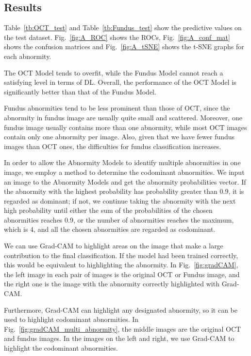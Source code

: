 \documentclass{article}
\begin{document}
	\begin{multicols}{2}
		
		\subsection{Results}
		
		Table~\ref{tb:OCT_test} and Table~\ref{tb:Fundus_test} show the predictive values on the test dataset. Fig.~\ref{fig:A_ROC} shows the ROCs, Fig.~\ref{fig:A_conf_mat} shows the confusion matrices and Fig.~\ref{fig:A_tSNE} shows the t-SNE graphs for each abnormity.
		
		The OCT Model tends to overfit, while the Fundus Model cannot reach a satisfying level in terms of DL. Overall, the performance of the OCT Model is significantly better than that of the Fundus Model.
		
		Fundus abnormities tend to be less prominent than those of OCT, since the abnormity in fundus image are usually quite small and scattered. Moreover, one fundus image usually contains more than one abnormity, while most OCT images contain only one abnormity per image. Also, given that we have fewer fundus images than OCT ones, the difficulties for fundus classification increases.
		
		In order to allow the Abnormity Models to identify multiple abnormities in one image, we employ a method to determine the codominant abnormities. We input an image to the Abnormity Models and get the abnormity probabilities vector. If the abnormity with the highest probability has probability greater than 0.9, it is regarded as dominant; if not, we continue taking the abnormity with the next high probability until either the sum of the probabilities of the chosen abnormities reaches 0.9, or the number of abnormities reaches the maximum, which is 4, and all the chosen abnormities are regarded as codominant. 
		
		\vspace{0.3cm}
		
		We can use Grad-CAM \autocite{Selvaraju_Cogswell_Das_Vedantam_Parikh_Batra} to highlight areas on the image that make a large contribution to the final classification. If the model had been trained correctly, this would be equivalent to highlighting the abnormity. In Fig.~\ref{fig:gradCAM}, the left image in each pair of images is the original OCT or Fundus image, and the right one is the image with the abnormity correctly highlighted with Grad-CAM. 
		
		Furthermore, Grad-CAM can highlight any designated abnormity, so it can be used to highlight codominant abnormities. In Fig.~\ref{fig:gradCAM_multi_abnormity}, the middle images are the original OCT and fundus images. In the images on the left and right, we use Grad-CAM to highlight the codominant abnormities.
	

\end{multicols}
\end{document}
